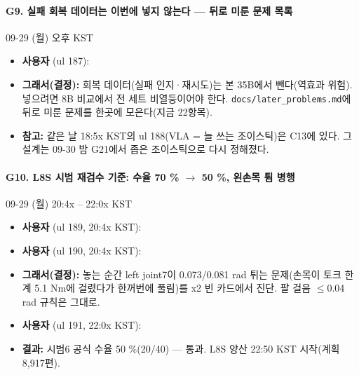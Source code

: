 \paragraph{G9. 실패 회복 데이터는 이번에 넣지 않는다 --- 뒤로 미룬 문제 목록}
{\small 09-29 (월) 오후 KST}
\begin{itemize}
  \item \textbf{사용자} (ul 187): 
  \item \textbf{그래서(결정):} 회복 데이터(실패 인지·재시도)는 본 35B에서 뺀다(역효과 위험). 넣으려면 8B 비교에서 전 세트 비열등이어야 한다. \texttt{docs/\allowbreak{}later\_\allowbreak{}problems.\allowbreak{}md}에 뒤로 미룬 문제를 한곳에 모은다(지금 22항목).
  \item \textbf{참고:} 같은 날 18:5x KST의 ul 188(VLA = 늘 쓰는 조이스틱)은 C13에 있다. 그 설계는 09-30 밤 G21에서 좁은 조이스틱으로 다시 정해졌다.
\end{itemize}

\paragraph{G10. L8S 시범 재검수 기준: 수율 70 \% $\rightarrow$ 50 \%, 왼손목 튐 병행}
{\small 09-29 (월) 20:4x -- 22:0x KST}
\begin{itemize}
  \item \textbf{사용자} (ul 189, 20:4x KST): 
  \item \textbf{사용자} (ul 190, 20:4x KST): 
  \item \textbf{그래서(결정):} 놓는 순간 left joint7이 0.073/0.081 rad 튀는 문제(손목이 토크 한계 5.1 Nm에 걸렸다가 한꺼번에 풀림)를 x2 빈 카드에서 진단. 팔 걸음 $\leq$0.04 rad 규칙은 그대로.
  \item \textbf{사용자} (ul 191, 22:0x KST): 
  \item \textbf{결과:} 시범6 공식 수율 50 \%(20/40) --- 통과. L8S 양산 22:50 KST 시작(계획 8,917편).
\end{itemize}

